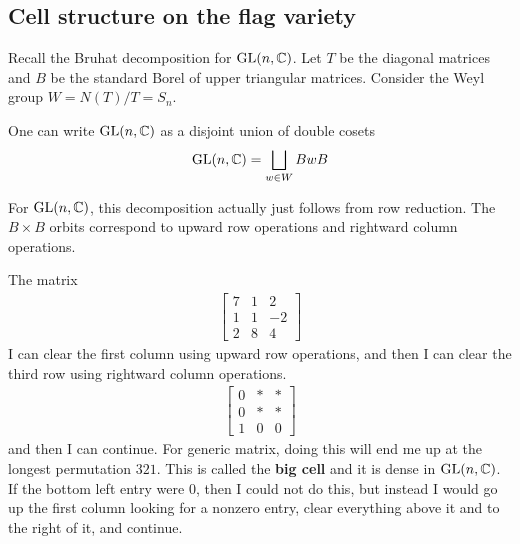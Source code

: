 \documentclass[12pt]{article}
\begin{document}

\hfill


\subsection{Cell structure on the flag variety}
Recall the Bruhat decomposition for $\operatorname{GL}(n,\mathbb{C})$. Let $T$ be the diagonal matrices and $B$ be the standard Borel of upper triangular matrices. 
Consider the Weyl group $W = N(T)/T = S_n$. \begin{theorem}
    One can write $\operatorname{GL}(n,\mathbb{C})$ as a disjoint union of double cosets \begin{align*}
        \operatorname{GL}(n,\mathbb{C}) = \bigsqcup_{w\in W} BwB
\end{align*}
\end{theorem}
For $\operatorname{GL}(n,\mathbb{C})$, this decomposition actually just follows from row reduction. The $B\times B$ orbits
correspond to upward row operations and rightward column operations. 

\begin{example}
    The matrix \begin{align*}
        \begin{bmatrix}
            7 & 1 & 2 \\
            1 & 1 & -2 \\
            2 & 8 & 4
        \end{bmatrix}
    \end{align*} I can clear the first column using upward row operations, and then I can clear the third row using rightward column operations.
    \begin{align*}
        \begin{bmatrix}
            0 & * & * \\
            0 & * & * \\
            1 & 0 & 0 
        \end{bmatrix}
    \end{align*} and then I can continue. For generic matrix,
    doing this will end me up at the longest permutation $321$. This is called the \textbf{big cell} and it is 
    dense in $\operatorname{GL}(n,\mathbb{C})$. If the bottom left entry were $0$, then I could not do this, but instead I would 
    go up the first column looking for a nonzero entry, clear everything above it and to the right of it, and continue.
\end{example}
\end{document}

